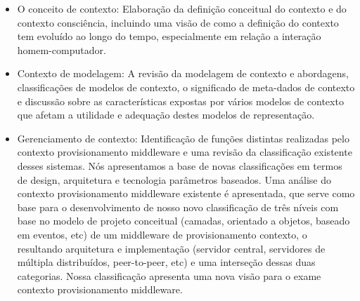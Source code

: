 \documentclass[12pt]{article} %
\begin{document}
\begin{itemize}
	\item O conceito de contexto: Elaboração da definição conceitual do contexto e do contexto consciência, incluindo uma visão de como a definição do contexto tem evoluído ao longo do tempo, especialmente em relação a interação homem-computador.
	\item Contexto de modelagem: A revisão da modelagem de contexto e abordagens, classificações de modelos de contexto, o significado de meta-dados de contexto e discussão 	sobre as características expostas por vários modelos de contexto que afetam a utilidade e adequação destes modelos de representação.
	\item Gerenciamento de contexto: Identificação de funções distintas realizadas pelo contexto provisionamento middleware e uma revisão da classificação existente desses sistemas. Nós apresentamos a base de novas classificações em termos de design, arquitetura e tecnologia parâmetros baseados. Uma análise do contexto provisionamento middleware existente é apresentada, que serve como base para o desenvolvimento de nosso novo classificação de três níveis com base no modelo de projeto conceitual (camadas, orientado a objetos, baseado em eventos, etc) de um middleware de provisionamento contexto, o resultando arquitetura e implementação (servidor central, servidores de múltipla distribuídos, peer-to-peer, etc) e uma interseção dessas duas categorias. Nossa classificação apresenta uma nova visão para o exame contexto provisionamento middleware.

\end{itemize}
\end{document}
